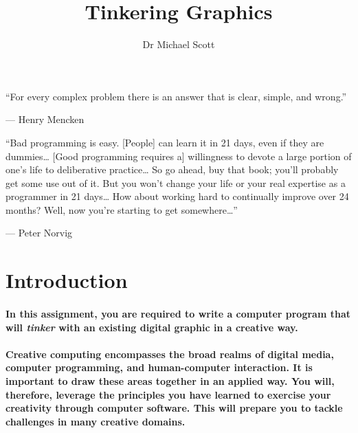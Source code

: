 \documentclass{../../fal_assignment}
\title{Tinkering Graphics}
\author{Dr Michael Scott}
\begin{document}
\maketitle

\begin{marginquote}
``For every complex problem there is an answer that is clear, simple, and wrong.''

--- Henry Mencken

\marginquoterule

``Bad programming is easy. [People] can learn it in 21 days, even if they are dummies… [Good programming requires a] willingness to devote a large portion of one's life to deliberative practice… So go ahead, buy that book; you'll probably get some use out of it. But you won't change your life or your real expertise as a programmer in 21 days… How about working hard to continually improve over 24 months? Well, now you're starting to get somewhere…''
\par --- Peter Norvig

\end{marginquote}

\vspace{-1em}

\section*{Introduction}

\paragraph{In this assignment, you are required to write a computer program that will \textit{tinker} with an existing digital graphic in a creative way.}

\paragraph{Creative computing encompasses the broad realms of digital media, computer programming, and human-computer interaction. It is important to draw these areas together in an applied way. You will, therefore, leverage the principles you have learned to exercise your creativity through computer software. This will prepare you to tackle challenges in many creative domains.}
\end{document}
